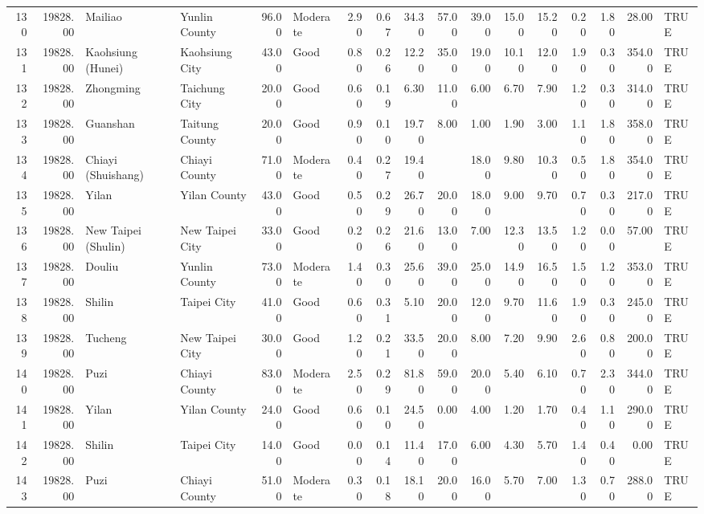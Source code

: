 \begin{table}[ht]
\begin{tabular}{rrllrlrrrrrrrrrrl}
  130 & 19828.00 & Mailiao & Yunlin County & 96.00 & Moderate & 2.90 & 0.67 & 34.30 & 57.00 & 39.00 & 15.00 & 15.20 & 0.20 & 1.80 & 28.00 & TRUE \\ 
  131 & 19828.00 & Kaohsiung (Hunei) & Kaohsiung City & 43.00 & Good & 0.80 & 0.26 & 12.20 & 35.00 & 19.00 & 10.10 & 12.00 & 1.90 & 0.30 & 354.00 & TRUE \\ 
  132 & 19828.00 & Zhongming & Taichung City & 20.00 & Good & 0.60 & 0.19 & 6.30 & 11.00 & 6.00 & 6.70 & 7.90 & 1.20 & 0.30 & 314.00 & TRUE \\ 
  133 & 19828.00 & Guanshan & Taitung County & 20.00 & Good & 0.90 & 0.10 & 19.70 & 8.00 & 1.00 & 1.90 & 3.00 & 1.10 & 1.80 & 358.00 & TRUE \\ 
  134 & 19828.00 & Chiayi (Shuishang) & Chiayi County & 71.00 & Moderate & 0.40 & 0.27 & 19.40 &  & 18.00 & 9.80 & 10.30 & 0.50 & 1.80 & 354.00 & TRUE \\ 
  135 & 19828.00 & Yilan & Yilan County & 43.00 & Good & 0.50 & 0.29 & 26.70 & 20.00 & 18.00 & 9.00 & 9.70 & 0.70 & 0.30 & 217.00 & TRUE \\ 
  136 & 19828.00 & New Taipei (Shulin) & New Taipei City & 33.00 & Good & 0.20 & 0.26 & 21.60 & 13.00 & 7.00 & 12.30 & 13.50 & 1.20 & 0.00 & 57.00 & TRUE \\ 
  137 & 19828.00 & Douliu & Yunlin County & 73.00 & Moderate & 1.40 & 0.30 & 25.60 & 39.00 & 25.00 & 14.90 & 16.50 & 1.50 & 1.20 & 353.00 & TRUE \\ 
  138 & 19828.00 & Shilin & Taipei City & 41.00 & Good & 0.60 & 0.31 & 5.10 & 20.00 & 12.00 & 9.70 & 11.60 & 1.90 & 0.30 & 245.00 & TRUE \\ 
  139 & 19828.00 & Tucheng & New Taipei City & 30.00 & Good & 1.20 & 0.21 & 33.50 & 20.00 & 8.00 & 7.20 & 9.90 & 2.60 & 0.80 & 200.00 & TRUE \\ 
  140 & 19828.00 & Puzi & Chiayi County & 83.00 & Moderate & 2.50 & 0.29 & 81.80 & 59.00 & 20.00 & 5.40 & 6.10 & 0.70 & 2.30 & 344.00 & TRUE \\ 
  141 & 19828.00 & Yilan & Yilan County & 24.00 & Good & 0.60 & 0.10 & 24.50 & 0.00 & 4.00 & 1.20 & 1.70 & 0.40 & 1.10 & 290.00 & TRUE \\ 
  142 & 19828.00 & Shilin & Taipei City & 14.00 & Good & 0.00 & 0.14 & 11.40 & 17.00 & 6.00 & 4.30 & 5.70 & 1.40 & 0.40 & 0.00 & TRUE \\ 
  143 & 19828.00 & Puzi & Chiayi County & 51.00 & Moderate & 0.30 & 0.18 & 18.10 & 20.00 & 16.00 & 5.70 & 7.00 & 1.30 & 0.70 & 288.00 & TRUE \\ 

\end{tabular}
\end{table}
